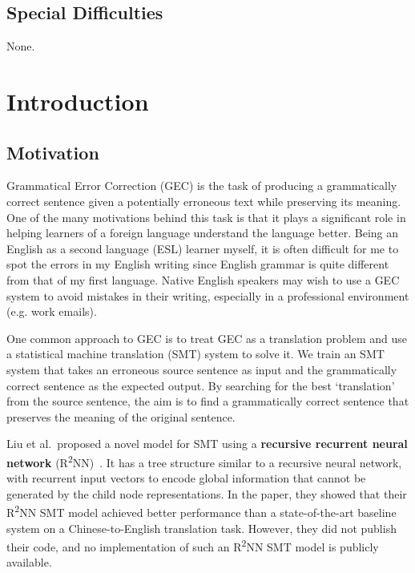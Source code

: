 \documentclass[12pt,a4paper,twoside]{report}
\begin{document}
\section*{Special Difficulties}
None.

\tableofcontents

\listoffigures

\pagestyle{headings}

\chapter{Introduction}

\section{Motivation}

Grammatical Error Correction (GEC) is the task of producing a grammatically correct sentence given a potentially erroneous text while preserving its meaning. One of the many motivations behind this task is that it plays a significant role in helping learners of a foreign language understand the language better. Being an English as a second language (ESL) learner myself, it is often difficult for me to spot the errors in my English writing since English grammar is quite different from that of my first language. Native English speakers may wish to use a GEC system to avoid mistakes in their writing, especially in a professional environment (e.g. work emails).

One common approach to GEC is to treat GEC as a translation problem and use a statistical machine translation (SMT) system to solve it. We train an SMT system that takes an erroneous source sentence as input and the grammatically correct sentence as the expected output. By searching for the best `translation' from the source sentence, the aim is to find a grammatically correct sentence that preserves the meaning of the original sentence.

Liu et al.~proposed a novel model for SMT using a \textbf{recursive recurrent neural network} (R\textsuperscript{2}NN)~\cite{r2nn}. It has a tree structure similar to a recursive neural network, with recurrent input vectors to encode global information that cannot be generated by the child node representations. In the paper, they showed that their R\textsuperscript{2}NN SMT model achieved better performance than a state-of-the-art baseline system on a Chinese-to-English translation task. However, they did not publish their code, and no implementation of such an R\textsuperscript{2}NN SMT model is publicly available.
\end{document}
